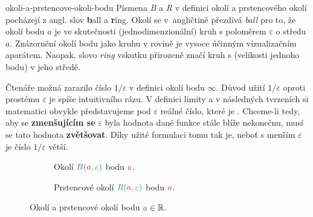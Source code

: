 \begin{remark}{}{okoli-a-prstencove-okoli-bodu}
 Písmena \emph{B} a \emph{R} v definici okolí a prstencového okolí pocházejí z
 angl. slov \textbf{b}all a \textbf{r}ing. Okolí se v~angličtině přezdívá
 \emph{ball} pro to, že okolí bodu $a$ je ve skutečnosti (jednodimenzionální)
 kruh s poloměrem $\varepsilon$ o středu $a$. Znázornění okolí bodu jako kruhu v
 rovině je vysoce účinným vizualizačním aparátem. Naopak, slovo \emph{ring}
 vskutku přirozeně značí kruh s  (velikosti jednoho bodu) v jeho
 středě. 

 Čtenáře možná zarazilo číslo $1 / \varepsilon$ v definici okolí bodu $\infty$.
 Důvod užití $1 / \varepsilon$ oproti prostému $\varepsilon$ je spíše
 intuitivního rázu. V definici limity a v následných tvrzeních si matematici
 obvykle představujeme pod $\varepsilon$ reálné číslo, které je . Chceme-li tedy, aby se \textbf{zmenšujícím se} $\varepsilon$ byla
 hodnota dané funkce stále blíže nekonečnu, musí se tato hodnota
 \textbf{zvětšovat}. Díky užité formulaci tomu tak je, neboť s menším
 $\varepsilon$ je číslo $1 / \varepsilon$ větší.
\end{remark}

\begin{figure}[ht]
 \centering
 \begin{subfigure}[b]{.49\textwidth}
  \centering
  \caption{Okolí $\clb{B(\clr{a},\varepsilon)}$ bodu $\clr{a}$.}
  \label{subfig:okoli-a-prstencove-okoli-bodu-1}
 \end{subfigure}
 \begin{subfigure}[b]{.49\textwidth}
  \centering
  \caption{Prstencové okolí $\clg{R(\clr{a},\varepsilon)}$ bodu $\clr{a}$.}
  \label{subfig:okoli-a-prstencove-okoli-bodu-2}
 \end{subfigure}
 \caption{Okolí a prstencové okolí bodu $\clr{a} \in \R$.}
 \label{fig:okoli-a-prstencove-okoli-bodu}
\end{figure}

